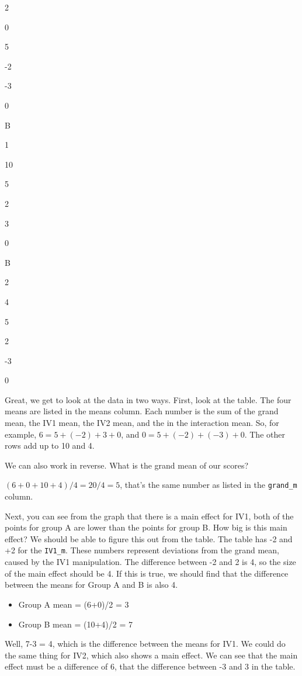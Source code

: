\documentclass[
]{book}
\begin{document}
2

0

5

-2

-3

0

B

1

10

5

2

3

0

B

2

4

5

2

-3

0

Great, we get to look at the data in two ways. First, look at the table. The four means are listed in the means column. Each number is the sum of the grand mean, the IV1 mean, the IV2 mean, and the in the interaction mean. So, for example, \(6 = 5 + (-2) + 3 + 0\), and \(0 = 5 + (-2) + (-3) + 0\). The other rows add up to 10 and 4.

We can also work in reverse. What is the grand mean of our scores?

\((6+0+10+4)/4 =20/4 = 5\), that's the same number as listed in the \texttt{grand\_m} column.

Next, you can see from the graph that there is a main effect for IV1, both of the points for group A are lower than the points for group B. How big is this main effect? We should be able to figure this out from the table. The table has -2 and +2 for the \texttt{IV1\_m}. These numbers represent deviations from the grand mean, caused by the IV1 manipulation. The difference between -2 and 2 is 4, so the size of the main effect should be 4. If this is true, we should find that the difference between the means for Group A and B is also 4.

\begin{itemize}
\item
  Group A mean = (6+0)/2 = 3
\item
  Group B mean = (10+4)/2 = 7
\end{itemize}

Well, 7-3 = 4, which is the difference between the means for IV1. We could do the same thing for IV2, which also shows a main effect. We can see that the main effect must be a difference of 6, that the difference between -3 and 3 in the table.
\end{document}
